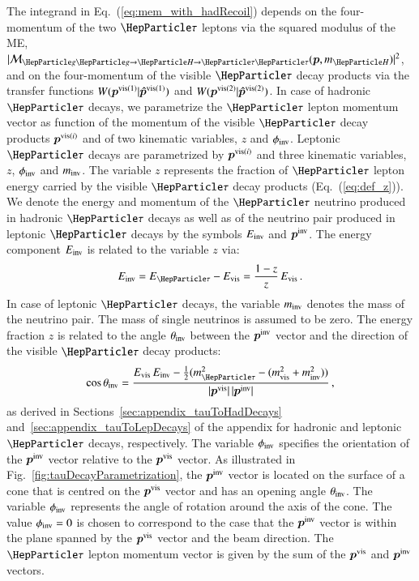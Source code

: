 The integrand in Eq.~(\ref{eq:mem_with_hadRecoil}) depends on the
four-momentum of the two $\Pgt$ leptons via the squared modulus of the
ME, $\vert \mathcal{M}_{\Pg\Pg \to \PHiggs \to \Pgt\Pgt}(\bm{p},m_{\PHiggs}) \vert^{2}$,
and on the four-momentum of the visible $\Pgt$ decay products via the
transfer functions $W( \bm{p}^{\textrm{vis}(1)} | \bm{\hat{p}}^{\textrm{vis}(1)} )$ and $W( \bm{p}^{\textrm{vis}(2)} | \bm{\hat{p}}^{\textrm{vis}(2)} )$.
In case of hadronic $\Pgt$ decays, 
we parametrize the $\Pgt$ lepton momentum vector as function of the
momentum of the visible $\Pgt$ decay products $\bm{p}^{\textrm{vis}(i)}$ and of two kinematic variables,
$z$ and $\phi_{\textrm{inv}}$.
Leptonic $\Pgt$ decays are parametrized by $\bm{p}^{\textrm{vis}(i)}$ and
three kinematic variables, $z$, $\phi_{\textrm{inv}}$ and $m_{\textrm{inv}}$.
The variable $z$ represents the fraction of $\Pgt$ lepton energy
carried by the visible $\Pgt$ decay products (\cf Eq.~(\ref{eq:def_z})).
We denote the energy and momentum of the $\Pgt$ neutrino
produced in hadronic $\Pgt$ decays as well as of the neutrino pair produced in leptonic $\Pgt$
decays by the symbols $E_{\textrm{inv}}$ and $\bm{p}^{\textrm{inv}}$.
The energy component $E_{\textrm{inv}}$ is related to the variable $z$ via:
\begin{equation}
E_{\inv} = E_{\Pgt} - E_{\vis} = \frac{1 - z}{z} \, E_{\vis} \, .
\label{eq:E_inv}
\end{equation}
In case of leptonic $\Pgt$ decays, the variable $m_{\textrm{inv}}$ denotes the
mass of the neutrino pair. The mass of single neutrinos is assumed
to be zero.
The energy fraction $z$ is related to the angle $\theta_{\textrm{inv}}$ between the $\bm{p}^{\textrm{inv}}$ vector and the direction of the visible $\Pgt$ decay products:
\begin{equation}
\cos\theta_{\inv} = \frac{E_{\vis} \, E_{\inv} - \frac{1}{2}(m^{2}_{\Pgt} - (m^{2}_{\vis} + m^{2}_{\inv}))}{\vert\bm{p}^{\vis}\vert \, \vert\bm{p}^{\inv}\vert} \, ,
\label{eq:theta_inv}
\end{equation}
as derived in Sections~\ref{sec:appendix_tauToHadDecays}
and~\ref{sec:appendix_tauToLepDecays} of the appendix for
hadronic and leptonic $\Pgt$ decays, respectively.
The variable $\phi_{\textrm{inv}}$ specifies the orientation of the
$\bm{p}^{\textrm{inv}}$ vector relative to the $\bm{p}^{\textrm{vis}}$ vector.
As illustrated in Fig.~\ref{fig:tauDecayParametrization}, the
$\bm{p}^{\textrm{inv}}$ vector is located on the surface of a cone that is centred
on the $\bm{p}^{\textrm{vis}}$ vector and has an opening angle $\theta_{\textrm{inv}}$.
The variable $\phi_{\textrm{inv}}$ represents the angle of rotation around the
axis of the cone.
The value $\phi_{\textrm{inv}} = 0$ is chosen to correspond to the case that
the $\bm{p}^{\textrm{inv}}$ vector is within the plane spanned by the
$\bm{p}^{\textrm{vis}}$ vector and the beam direction.
The $\Pgt$ lepton momentum vector is given by the sum of the
$\bm{p}^{\textrm{vis}}$ and $\bm{p}^{\textrm{inv}}$ vectors.

